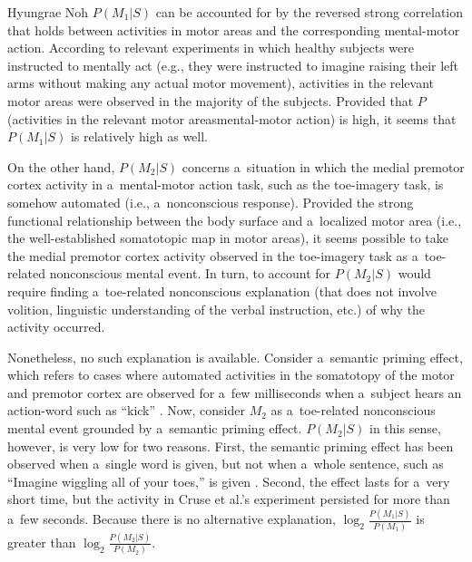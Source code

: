 \begin{artengenv}{Hyungrae Noh}
$P(M_1 | S)$ can be accounted for by the reversed strong correlation that holds between activities in motor areas and the corresponding mental-motor action. According to relevant experiments
\parencites[e.g.,][]{pfurtscheller_motor_1997}[][]{ehrsson_imagery_2003} %
 in which healthy subjects were instructed to mentally act (e.g., they were instructed to imagine raising their left arms without making any actual motor movement), activities in the relevant motor areas were observed in the majority of the subjects. Provided that $P$(activities in the relevant motor areas{\textbar}mental-motor action) is high, it seems that $P(M_1 | S)$ is relatively high as well.

On the other hand, $P(M_2 | S)$ concerns a~situation in which the medial premotor cortex activity in a~mental-motor action task, such as the toe-imagery task, is somehow automated (i.e., a~nonconscious response). Provided the strong functional relationship between the body surface and a~localized motor area (i.e., the well-established somatotopic map in motor areas), it seems possible to take the medial premotor cortex activity observed in the toe-imagery task as a~toe-related nonconscious mental event. In turn, to account for $P(M_2 | S)$ would require finding a~toe-related nonconscious explanation (that does not involve volition, linguistic understanding of the verbal instruction, etc.) of why the activity occurred.

Nonetheless, no such explanation is available. Consider a~semantic priming effect, which refers to cases where automated activities in the somatotopy of the motor and premotor cortex are observed for a~few milliseconds when a~subject hears an action-word such as ``kick''
\parencite[][]{pulvermuller_brain_2005}. %
 Now, consider $M_2$ as a~toe-related nonconscious mental event grounded by a~semantic priming effect. $P(M_2 | S)$ in this sense, however, is very low for two reasons. First, the semantic priming effect has been observed when a~single word is given, but not when a~whole sentence, such as ``Imagine wiggling all of your toes,'' is given 
\parencite[][]{raposo_modulation_2009}. %
 Second, the effect lasts for a~very short time, but the activity in Cruse et al.'s experiment persisted for more than a~few seconds. Because there is no alternative explanation, $\log _2\frac{P(M_1|S)}{P(M_1)}$ is greater than $\log _2\frac{P(M_2|S)}{P(M_2)}$.


\end{artengenv}
